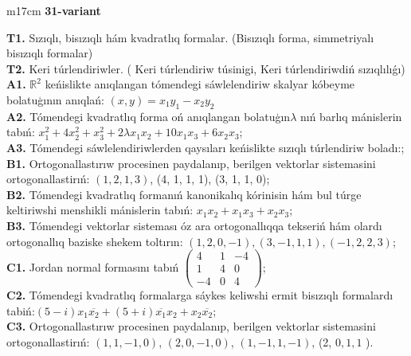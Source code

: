 \documentclass{article}
\begin{document}
\begin{tabular}{m{17cm}}
\textbf{31-variant}
\newline

\textbf{T1.} Sızıqlı, bisızıqlı hám kvadratlıq formalar. (Bisızıqlı forma,  simmetriyalı bisızıqlı formalar)  \\
\textbf{T2.} Keri túrlendiriwler. ( Keri túrlendiriw túsinigi,   Keri túrlendiriwdiń sızıqlılıǵı) \\
\textbf{A1.} \(\mathbb{R}^{2}\) keńislikte anıqlangan tómendegi sáwlelendiriw skalyar kóbeyme bolatuģının anıqlań: \((x,y) = x_{1}y_{1} - x_{2}y_{2}\) \\
\textbf{A2.} Tómendegi kvadratlıq forma oń anıqlangan bolatuģın\(\lambda\) nıń barlıq mánislerin tabıń: \(x_{1}^{2} + 4x_{2}^{2} + x_{3}^{2} + 2\lambda x_{1}x_{2} + 10x_{1}x_{3} + 6x_{2}x_{3}\); \\
\textbf{A3.} Tómendegi sáwlelendiriwlerden qaysıları keńislikte sızıqlı túrlendiriw boladı:; \\
\textbf{B1.} Ortogonallastırıw procesinen paydalanıp, berilgen vektorlar sistemasini ortogonallastirıń: \((1,2,1,3)\), (4, 1, 1, 1), (3, 1, 1, 0); \\
\textbf{B2.} Tómendegi kvadratlıq formanıń kanonikalıq kórinisin hám bul túrge keltiriwshi menshikli mánislerin tabıń: \(x_{1}x_{2} + x_{1}x_{3} + x_{2}x_{3}\); \\
\textbf{B3.} Tómendegi vektorlar sisteması óz ara ortogonallıqqa tekseriń hám olardı ortogonallıq baziske shekem toltırın: \((1,2,0, - 1),(3, - 1,1,1),( - 1,2,2,3)\); \\
\textbf{C1.} Jordan normal formasını tabıń \(\begin{pmatrix} 4 & 1 & - 4 \\ 1 & 4 & 0 \\  - 4 & 0 & 4 \end{pmatrix}\); \\
\textbf{C2.} Tómendegi kvadratlıq formalarga sáykes keliwshi ermit bisızıqlı formalardı tabiń:\((5 - i)x_{1}\overline{x_{2}} + (5 + i)\overline{x_{1}}x_{2} + x_{2}\overline{x_{2}}\); \\
\textbf{C3.} Ortogonallastırıw procesinen paydalanıp, berilgen vektorlar sistemasini ortogonallastirıń: \((1,1, - 1,0)\), \((2,0, - 1,0)\), \((1, - 1,1, - 1)\), (2, \(0,1,1\) ). \\

\end{tabular}
\vspace{1cm}
\end{document}
